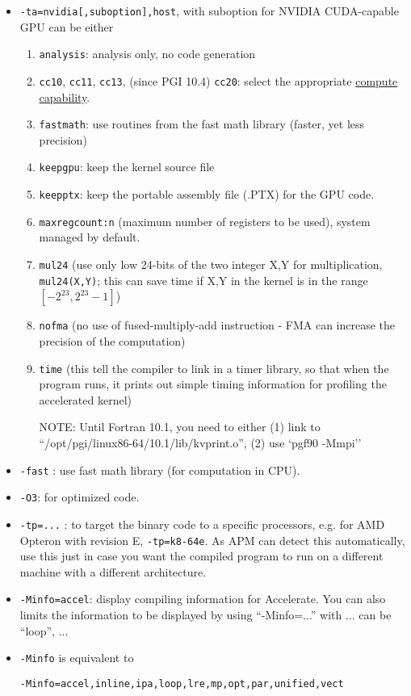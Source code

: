 \begin{itemize}
\item \verb!-ta=nvidia[,suboption],host!, with suboption for NVIDIA
  CUDA-capable GPU can be either
  \begin{enumerate}
  \item \verb!analysis!: analysis only, no code generation
  \item \verb!cc10!, \verb!cc11!, \verb!cc13!, (since PGI 10.4)
    \verb!cc20!: select the appropriate
    \hyperref[sec:compute-capability]{compute capability}.
  \item \verb!fastmath!: use routines from the fast math library
    (faster, yet less precision)
  \item \verb!keepgpu!: keep the kernel source file
  \item \verb!keepptx!: keep the portable assembly file (.PTX) for the
    GPU code.
  \item \verb!maxregcount:n! (maximum number of registers to be used),
    system managed by default.
  \item \verb!mul24! (use only low 24-bits of the two integer X,Y for
    multiplication, \verb!mul24(X,Y)!; this can save time if X,Y in
    the kernel is in the range $[-2^{23},2^{23}-1]$)
  \item \verb!nofma! (no use of fused-multiply-add instruction - FMA
    can increase the precision of the computation)
  \item \verb!time! (this tell the compiler to link in a timer
    library, so that when the program runs, it prints out simple timing
    information for profiling the accelerated kernel)

NOTE: Until Fortran 10.1, you need to either (1) link to
``/opt/pgi/linux86-64/10.1/lib/kvprint.o'', (2) use `pgf90 -Mmpi'' 

  \end{enumerate}
\item \verb!-fast! : use fast math library (for computation in CPU).
\item \verb!-O3!: for optimized code.
\item \verb!-tp=...! : to target the binary code to a specific
  processors, e.g. for AMD Opteron with revision E,
  \verb!-tp=k8-64e!. As APM can detect this automatically, use this
  just in case you want the compiled program to run on a different
  machine with a different architecture.
\item \verb!-Minfo=accel!: display compiling
  information for Accelerate. You can also limits the information to
  be displayed by using ``-Minfo=...'' with ... can be ``loop'', ...
\item \verb!-Minfo! is equivalent to 
\begin{lstlisting}
-Minfo=accel,inline,ipa,loop,lre,mp,opt,par,unified,vect
\end{lstlisting}
\end{itemize}

